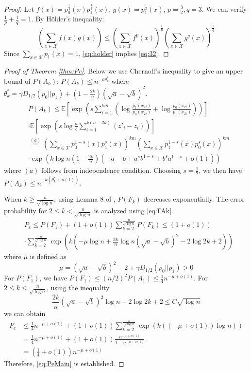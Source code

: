 \documentclass[conference,letterpaper]{IEEEtran}
\begin{document}
\begin{proof}
	Let $f(x)=p^{\frac{1}{3}}_0(x)p^{\frac{1}{3}}_1(x)$, $g(x) = p^{\frac{1}{3}}_1(x)$,
	$p=\frac{3}{2}, q=3$. We can verify $\frac{1}{p} + \frac{1}{q}=1$.
	By Hölder's inequality:
	\begin{equation}\label{eq:holder}
		(\sum_{x\in\mathcal{X}}f(x)g(x))\leq (\sum_{x\in\mathcal{X}} f^p(x))^{\frac{1}{p}}
		(\sum_{x\in\mathcal{X}} g^q(x))^{\frac{1}{q}}
	\end{equation}
	Since $\sum_{x\in\mathcal{X}} p_1(x)=1$, \eqref{eq:holder} implies
	\eqref{eq:32}.
\end{proof}
\begin{proof}[Proof of Theorem \ref{thm:Pe}]
Below we use Chernoff's inequality
to give an upper bound of $P(A_k)$:
$P(A_k) \leq n^{-k\theta^*_k}$ where $\theta^*_k=\gamma D_{1/2}(p_0||p_1)+(1-\frac{2k}{n})(\sqrt{a}-\sqrt{b})^2$.
\begin{align*}
&P(A_k) \leq \mathbb{E}
\left[\exp \left( s\sum_{i=1}^{km}
\left( \log \frac{p_1(x_{1i})}{p_0(x_{2i})}
+ \log \frac{p_0(x_{2i})}{p_1(x_{2i})} \right)
\right)\right]\\
& \cdot \mathbb{E}
\left[\exp\left(s\log \frac{a}{b}\sum_{i=1}^{k(n-2k)} (z'_i - z_i )\right)
\right] \\
& \stackrel{(a)}{=} (\sum_{x\in \mathcal{X}} p_0^{1-s}(x)p_1^{s}(x))^{km} (\sum_{x\in \mathcal{X}} p_1^{1-s}(x)p_0^{s}(x))^{km}\\
&   \cdot \exp(k\log n (1-\frac{2k}{n})(-a-b+a^sb^{1-s}+b^sa^{1-s} +o(1)) )
\end{align*}
where $(a)$ follows from independence condition. Choosing $s=\frac{1}{2}$, we then have 
$P(A_k) \leq  n^{-k(\theta^*_k+o(1))}$.

When $k \geq \frac{n}{\sqrt{\log n}}$, using Lemma 8 of \cite{feng2021},
$P(F_k)$ decreases exponentially. The error probability for $2\leq k < \frac{n}{\sqrt{\log n}}$
is analyzed using \eqref{eq:FAk}.
\begin{align*}
&P_e \leq P(F_1)+(1+o(1))\sum_{k=2}^{\frac{n}{\sqrt{\log n}}} P(F_k) \leq (1+o(1))\\
& \cdot \sum_{k=2}^{\frac{n}{\sqrt{\log n}}}
\exp(k(-\mu \log n + \frac{2k}{n} \log n(\sqrt{a} - \sqrt{b})^2 - 2\log 2k + 2))
\end{align*}
where $\mu$ is defined as
\begin{equation}\label{eq:mu_def}
	\mu = (\sqrt{a} - \sqrt{b})^2-2 + \gamma D_{1/2}(p_0||p_1) > 0	
\end{equation}
For $P(F_1)$, we
have $P(F_1)\leq (n/2)^2
P(A_1)\leq \frac{1}{4}n^{-\mu+o(1)}$.
For $2\leq k \leq \frac{n}{\sqrt{\log n}}$, using the inequality
$$
\frac{2k}{n}(\sqrt{a} - \sqrt{b})^2\log n -2\log2k+2\leq  C\sqrt{\log n}
$$
we can obtain
\begin{align*}
P_e &\leq \frac{1}{4}n^{-\mu + o(1)} +(1+o(1)) \sum_{k=2}^{\frac{n}{\sqrt{\log n}}} \exp(k((-\mu + o(1)) \log n )) \\
& =\frac{1}{4}n^{-\mu + o(1)}+(1+o(1)) \frac{n^{-\mu + o(1)}}{1-n^{-\mu + o(1)}} \\
&= (\frac{1}{4}+o(1))n^{-\mu + o(1)}
\end{align*}
Therefore, \eqref{eq:PeMain} is established.


\end{proof}
\end{document}
